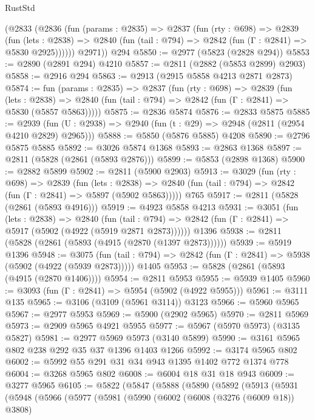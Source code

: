 \begin{lexlean}{RustStd}
\begin{coremodule}
      (@2833
        (@2836
          (fun (params : @2835) =>
          @2837
            (fun (rty : @698) =>
            @2839
              (fun (lets : @2838) =>
              @2840 (fun (tail : @794) => @2842 (fun (Γ : @2841) => @5830 @2925))))))
        @2971))
    @294
@5850 := @2977 (@5823 (@2828 @294))
@5853 := @2890 (@2891 @294) @4210
@5857 := @2811 (@2882 (@5853 @2899) @2903)
@5858 := @2916 @294
@5863 := @2913 (@2915 @5858 @4213 @2871 @2873)
@5874 := fun (params : @2835) =>
  @2837
    (fun (rty : @698) =>
    @2839
      (fun (lets : @2838) =>
      @2840 (fun (tail : @794) => @2842 (fun (Γ : @2841) => @5830 (@5857 @5863)))))
@5875 := @2836 @5874
@5876 := @2833 @5875
@5885 := @2939 (fun (U : @2938) => @2940 (fun (t : @29) => @2948 (@2811 (@2954 @4210 @2829) @2965)))
@5888 := @5850 (@5876 @5885) @4208
@5890 := @2796 @5875 @5885
@5892 := @3026 @5874 @1368
@5893 := @2863 @1368
@5897 := @2811 (@5828 (@2861 (@5893 @2876)))
@5899 := @5853 (@2898 @1368)
@5900 := @2882 @5899
@5902 := @2811 (@5900 @2903)
@5913 := @3029
    (fun (rty : @698) =>
    @2839
      (fun (lets : @2838) =>
      @2840 (fun (tail : @794) => @2842 (fun (Γ : @2841) => @5897 (@5902 @5863)))))
    @765
@5917 := @2811 (@5828 (@2861 (@5893 @4916)))
@5919 := @4923 @5858 @4213
@5931 := @3051
    (fun (lets : @2838) =>
    @2840
      (fun (tail : @794) => @2842 (fun (Γ : @2841) => @5917 (@5902 (@4922 (@5919 @2871 @2873))))))
    @1396
@5938 := @2811 (@5828 (@2861 (@5893 (@4915 (@2870 (@1397 @2873))))))
@5939 := @5919 @1396
@5948 := @3075
    (fun (tail : @794) => @2842 (fun (Γ : @2841) => @5938 (@5902 (@4922 (@5939 @2873)))))
    @1405
@5953 := @5828 (@2861 (@5893 (@4915 (@2870 @1406))))
@5954 := @2811 @5953
@5955 := @5939 @1405
@5960 := @3093 (fun (Γ : @2841) => @5954 (@5902 (@4922 @5955)))
@5961 := @3111 @135
@5965 := @3106 (@3109 (@5961 @3114)) @3123
@5966 := @5960 @5965
@5967 := @2977 @5953
@5969 := @5900 (@2902 @5965)
@5970 := @2811 @5969
@5973 := @2909 @5965 @4921 @5955
@5977 := @5967 (@5970 @5973) (@3135 @5827)
@5981 := @2977 @5969 @5973 (@3140 @5899)
@5990 := @3161 @5965 @802 @238 @292 @35 @37 @1396 @1403 @1266
@5992 := @3174 @5965 @802
@6002 := @5992 @55 @291 @31 @34 @943 @1395 @1402 @772 @1374 @778
@6004 := @3268 @5965 @802
@6008 := @6004 @18 @31 @18 @943
@6009 := @3277 @5965
@6105 := @5822
    (@5847
      (@5888
        (@5890
          (@5892
            (@5913
              (@5931
                (@5948
                  (@5966
                    (@5977
                      (@5981
                        (@5990
                          (@6002
                            (@6008 (@3276 (@6009 @18)) @3808)

\end{coremodule}
\end{lexlean}
